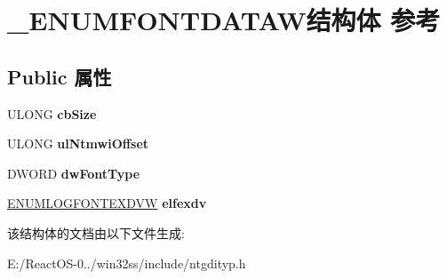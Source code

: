 \hypertarget{struct___e_n_u_m_f_o_n_t_d_a_t_a_w}{}\section{\+\_\+\+E\+N\+U\+M\+F\+O\+N\+T\+D\+A\+T\+A\+W结构体 参考}
\label{struct___e_n_u_m_f_o_n_t_d_a_t_a_w}
\subsection*{Public 属性}
\begin{DoxyCompactItemize}
\item 
\mbox{\label{struct___e_n_u_m_f_o_n_t_d_a_t_a_w_a2f34746935c89cc2d28b823254042ca1}} 
U\+L\+O\+NG {\bfseries cb\+Size}
\item 
\mbox{\label{struct___e_n_u_m_f_o_n_t_d_a_t_a_w_afe7364da9c84a3f4cae604bb7a120508}} 
U\+L\+O\+NG {\bfseries ul\+Ntmwi\+Offset}
\item 
\mbox{\label{struct___e_n_u_m_f_o_n_t_d_a_t_a_w_a5fd83c88c649f8885985d1d6a6ae7bd0}} 
D\+W\+O\+RD {\bfseries dw\+Font\+Type}
\item 
\mbox{\label{struct___e_n_u_m_f_o_n_t_d_a_t_a_w_a626e63638f3a997ba8836c02abe31439}} 
\hyperlink{structtag_e_n_u_m_l_o_g_f_o_n_t_e_x_d_v_w}{E\+N\+U\+M\+L\+O\+G\+F\+O\+N\+T\+E\+X\+D\+VW} {\bfseries elfexdv}
\end{DoxyCompactItemize}


该结构体的文档由以下文件生成\+:\begin{DoxyCompactItemize}
\item 
E\+:/\+React\+O\+S-\/0../win32ss/include/ntgdityp.\+h\end{DoxyCompactItemize}
